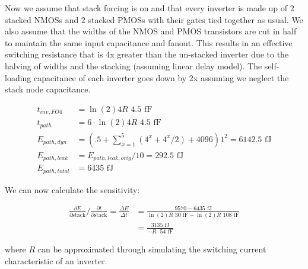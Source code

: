 \documentclass[11pt]{article}
\begin{document}
Now we assume that stack forcing is on and that every inverter is made up of 2 stacked NMOSs and 2 stacked PMOSs with their gates tied together as usual. We also assume that the widths of the NMOS and PMOS transistors are cut in half to maintain the same input capacitance and fanout. This results in an effective switching resistance that is 4x greater than the un-stacked inverter due to the halving of widths and the stacking (assuming linear delay model). The self-loading capacitance of each inverter goes down by 2x assuming we neglect the stack node capacitance.

\begin{align}
	t_{inv,FO4} &= \ln(2) 4R \text{ 4.5 fF} \nonumber \\
	t_{path} &= 6 \cdot \ln(2) 4R \text{ 4.5 fF} \nonumber \\
	E_{path,dyn} &= (.5 + \sum_{x=1}^{5}(4^x + 4^x/2) + 4096) 1^2 = 6142.5 \text{ fJ} \nonumber \\
	E_{path,leak} &= E_{path,leak,orig} / 10 = 292.5 \text{ fJ} \nonumber \\
	E_{path,total} &= 6435 \text{ fJ} \nonumber
\end{align}

We can now calculate the sensitivity:

\begin{align}
	\frac{\partial E}{\partial \text{stack}} \bigg/ \frac{\partial t}{\partial \text{stack}} = \frac{\Delta E}{\Delta t} &= \frac{9570 - 6435 \text{ fJ}}{\ln(2) R \text{ 30 fF} - \ln(2) R \text{ 108 fF}} \nonumber \\
	&= \frac{3135 \text{ fJ}}{-R \cdot 54 \text{ fF}} \nonumber
\end{align}

where $R$ can be approximated through simulating the switching current characteristic of an inverter.

\newpage
\appendix
\end{document}
